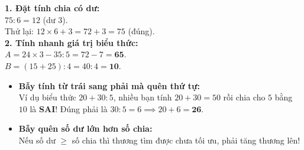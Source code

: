 \documentclass[11pt,a4paper]{article}
\begin{document}
\vspace{-2.5mm}
\noindent
\begin{minipage}[t]{0.49\textwidth}\vspace{0pt}
\begin{tcolorbox}[
  enhanced,
  colback=green!4!white,
  colframe=green!60!black,
  arc=2mm, boxrule=0.8pt,
  left=2mm, right=2mm, top=1.8mm, bottom=1.8mm,
  title={\footnotesize\bfseries\color{white}\faCheckCircle\ Ví dụ thực hành chuẩn mực}
]
{\footnotesize
\textbf{1. Đặt tính chia có dư:}\\
$75 : 6 = 12$ (dư $3$).\\
Thử lại: $12 \times 6 + 3 = 72 + 3 = 75$ (đúng).\\
\textbf{2. Tính nhanh giá trị biểu thức:}\\
$A = 24 \times 3 - 35 : 5 = 72 - 7 = \mathbf{65}$.\\
$B = (15 + 25) : 4 = 40 : 4 = \mathbf{10}$.
}
\end{tcolorbox}
\end{minipage}
\hfill
\begin{minipage}[t]{0.49\textwidth}\vspace{0pt}
\begin{tcolorbox}[
  enhanced,
  colback=red!4!white,
  colframe=red!70!black,
  arc=2mm, boxrule=0.8pt,
  left=2mm, right=2mm, top=1.8mm, bottom=1.8mm,
  title={\footnotesize\bfseries\color{white}\faExclamationTriangle\ Mẹo tránh bẫy trắc nghiệm}
]
{\footnotesize
\begin{itemize}\setlength{\itemsep}{1.5pt}\setlength{\leftskip}{-2.5mm}
  \item \textbf{Bẫy tính từ trái sang phải mà quên thứ tự:}\\
  Ví dụ biểu thức $20 + 30 : 5$, nhiều bạn tính $20 + 30 = 50$ rồi chia cho $5$ bằng $10$ là \textbf{SAI}! Đúng phải là $30 : 5 = 6 \implies 20 + 6 = \mathbf{26}$.
  \item \textbf{Bẫy quên số dư lớn hơn số chia:}\\
  Nếu số dư $\ge$ số chia thì thương tìm được chưa tối ưu, phải tăng thương lên!
\end{itemize}
}
\end{tcolorbox}
\end{minipage}
\end{document}
